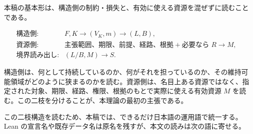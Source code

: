 \documentclass[12pt,a4paper]{article}
\begin{document}
本稿の基本形は、構造側の制約・損失と、有効に使える資源を混ぜずに読むことである。

\[
\begin{array}{ll}
\text{構造側:} & F,K \to (V_K,m) \to (L,B),\\
\text{資源側:} & \text{主張範囲、期限、前提、経路、根拠}
                 + \text{必要なら }R \to M,\\
\text{境界読み出し:} & (L/B,M) \to S.
\end{array}
\]

構造側は、何として持続しているのか、何がそれを担っているのか、その維持可能領域がどのように狭まるのかを読む。資源側は、名目上ある資源ではなく、指定された対象、期限、経路、権限、根拠のもとで実際に使える有効資源 \(M\) を読む。この二枝を分けることが、本理論の最初の主張である。

この二枝構造を読むため、本稿では、できるだけ日本語の運用語で統一する。Lean の宣言名や既存データ名は原名を残すが、本文の読みは次の語に寄せる。
\end{document}
